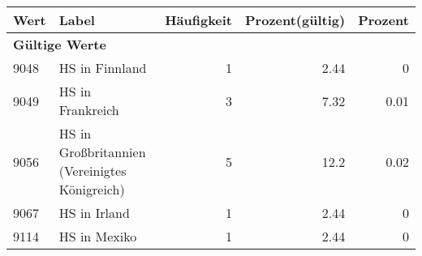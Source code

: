      \begin{longtable}{lXrrr}
     \toprule
     \textbf{Wert} & \textbf{Label} & \textbf{Häufigkeit} & \textbf{Prozent(gültig)} & \textbf{Prozent} \\
     \endhead
     \midrule
     \multicolumn{5}{l}{\textbf{Gültige Werte}}\\

     9048 &
     \multicolumn{1}{X}{ HS in Finnland   } &


       \num{1} &
       \num[round-mode=places,round-precision=2]{2.44} &
         \num[round-mode=places,round-precision=2]{0} \\

     9049 &
     \multicolumn{1}{X}{ HS in Frankreich   } &


       \num{3} &
       \num[round-mode=places,round-precision=2]{7.32} &
         \num[round-mode=places,round-precision=2]{0.01} \\

     9056 &
     \multicolumn{1}{X}{ HS in Großbritannien (Vereinigtes Königreich)   } &


       \num{5} &
       \num[round-mode=places,round-precision=2]{12.2} &
         \num[round-mode=places,round-precision=2]{0.02} \\

     9067 &
     \multicolumn{1}{X}{ HS in Irland   } &


       \num{1} &
       \num[round-mode=places,round-precision=2]{2.44} &
         \num[round-mode=places,round-precision=2]{0} \\

     9114 &
     \multicolumn{1}{X}{ HS in Mexiko   } &


       \num{1} &
       \num[round-mode=places,round-precision=2]{2.44} &
         \num[round-mode=places,round-precision=2]{0} \\


\end{longtable}
